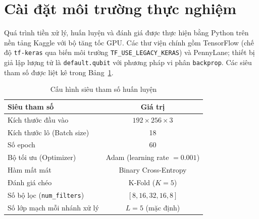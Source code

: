 \begin{table}[h]
\centering
\caption{Tổng hợp đặc điểm các tập dữ liệu thực nghiệm}
\label{tab:datasets}
\end{table}

\FloatBarrier

\section{Cài đặt môi trường thực nghiệm}
Quá trình tiền xử lý, huấn luyện và đánh giá được thực hiện bằng Python trên nền tảng Kaggle với bộ tăng tốc GPU. Các thư viện chính gồm TensorFlow (chế độ \texttt{tf-keras} qua biến môi trường \texttt{TF\_USE\_LEGACY\_KERAS}) và PennyLane; thiết bị giả lập lượng tử là \texttt{default.qubit} với phương pháp vi phân \texttt{backprop}. Các siêu tham số được liệt kê trong Bảng~\ref{tab:hyperparams}.

\begin{table}[h]
\centering
\caption{Cấu hình siêu tham số huấn luyện}
\label{tab:hyperparams}
\begin{tabular}{|l|c|}
\hline
\textbf{Siêu tham số} & \textbf{Giá trị} \\ \hline
Kích thước đầu vào & $192 \times 256 \times 3$ \\ \hline
Kích thước lô (Batch size) & 18 \\ \hline
Số epoch & 60 \\ \hline
Bộ tối ưu (Optimizer) & Adam (learning rate $= 0.001$) \\ \hline
Hàm mất mát & Binary Cross-Entropy \\ \hline
Đánh giá chéo & K-Fold ($K = 5$) \\ \hline
Số bộ lọc (\texttt{num\_filters}) & $[8, 16, 32, 16, 8]$ \\ \hline
Số lớp mạch mỗi nhánh xử lý & $L=5$ (mặc định) \\ \hline
\end{tabular}
\end{table}

